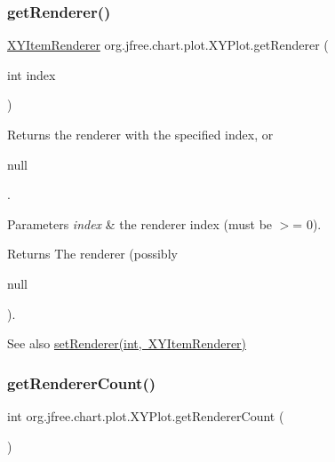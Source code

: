 \subsubsection{\texorpdfstring{get\+Renderer()}{getRenderer()}\hspace{0.1cm}{\footnotesize\ttfamily [2/2]}}
{\footnotesize\ttfamily \mbox{\hyperlink{interfaceorg_1_1jfree_1_1chart_1_1renderer_1_1xy_1_1_x_y_item_renderer}{X\+Y\+Item\+Renderer}} org.\+jfree.\+chart.\+plot.\+X\+Y\+Plot.\+get\+Renderer (\begin{DoxyParamCaption}\item[{int}]{index }\end{DoxyParamCaption})}

Returns the renderer with the specified index, or
\begin{DoxyCode}
null 
\end{DoxyCode}
 .


\begin{DoxyParams}{Parameters}
{\em index} & the renderer index (must be $>$= 0).\\
\hline
\end{DoxyParams}
\begin{DoxyReturn}{Returns}
The renderer (possibly
\begin{DoxyCode}
null 
\end{DoxyCode}
 ).
\end{DoxyReturn}
\begin{DoxySeeAlso}{See also}
\mbox{\hyperlink{classorg_1_1jfree_1_1chart_1_1plot_1_1_x_y_plot_a9168d5fc85bd04d15231042574e98285}{set\+Renderer(int, X\+Y\+Item\+Renderer)}} 
\end{DoxySeeAlso}
\mbox{\label{classorg_1_1jfree_1_1chart_1_1plot_1_1_x_y_plot_a0ced5baf50c48faf2b27a44e3d5f12e2}} 
\subsubsection{\texorpdfstring{get\+Renderer\+Count()}{getRendererCount()}}
{\footnotesize\ttfamily int org.\+jfree.\+chart.\+plot.\+X\+Y\+Plot.\+get\+Renderer\+Count (\begin{DoxyParamCaption}{ }\end{DoxyParamCaption})}

